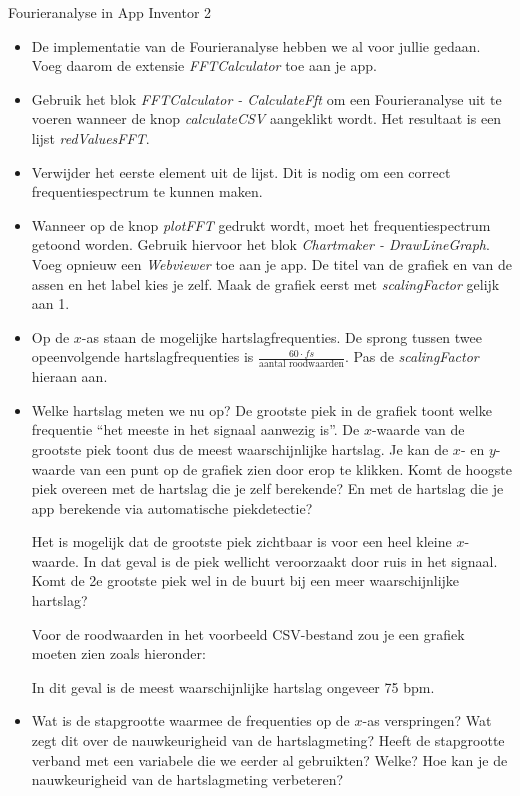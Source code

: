\begin{opdracht}{Fourieranalyse in App Inventor 2}
\begin{itemize}
 	\item De implementatie van de Fourieranalyse hebben we al voor jullie gedaan. Voeg daarom de extensie \emph{FFTCalculator} toe aan je app.
 	
	\item Gebruik het blok \emph{FFTCalculator - CalculateFft} om een Fourieranalyse uit te voeren wanneer de knop \emph{calculateCSV} aangeklikt wordt. Het resultaat is een lijst \emph{redValuesFFT}. 
	
	\item Verwijder het eerste element uit de lijst. Dit is nodig om een correct frequentiespectrum te kunnen maken.
	
	\item Wanneer op de knop \emph{plotFFT} gedrukt wordt, moet het frequentiespectrum getoond worden. Gebruik hiervoor het blok \emph{Chartmaker - DrawLineGraph}. Voeg opnieuw een \emph{Webviewer} toe aan je app. De titel van de grafiek en van de assen en het label kies je zelf. Maak de grafiek eerst met \emph{scalingFactor} gelijk aan 1.
	
	\item Op de $x$-as staan de mogelijke hartslagfrequenties. De sprong tussen twee opeenvolgende hartslagfrequenties is $\frac{60 \cdot fs}{\text{aantal roodwaarden}}$. Pas de \emph{scalingFactor} hieraan aan.

	
	\item Welke hartslag meten we nu op? De grootste piek in de grafiek toont welke frequentie \textquotedblleft het meeste in het signaal aanwezig is\textquotedblright. De $x$-waarde van de grootste piek toont dus de meest waarschijnlijke hartslag. Je kan de $x$- en $y$- waarde van een punt op de grafiek zien door erop te klikken. Komt de hoogste piek overeen met de hartslag die je zelf berekende? En met de hartslag die je app berekende via automatische piekdetectie?

	
	\begin{opmerking}
		Het is mogelijk dat de grootste piek zichtbaar is voor een heel kleine $x$-waarde. In dat geval is de piek wellicht veroorzaakt door ruis in het signaal. Komt de 2e grootste piek wel in de buurt bij een meer waarschijnlijke hartslag?
	\end{opmerking}

	Voor de roodwaarden in het voorbeeld CSV-bestand zou je een grafiek moeten zien zoals hieronder: 
	
	
	In dit geval is de meest waarschijnlijke hartslag ongeveer 75 bpm.
	
	\item Wat is de stapgrootte waarmee de frequenties op de $x$-as verspringen? Wat zegt dit over de nauwkeurigheid van de hartslagmeting? Heeft de stapgrootte verband met een variabele die we eerder al gebruikten? Welke? Hoe kan je de nauwkeurigheid van de hartslagmeting verbeteren?
\end{itemize}
\end{opdracht}






